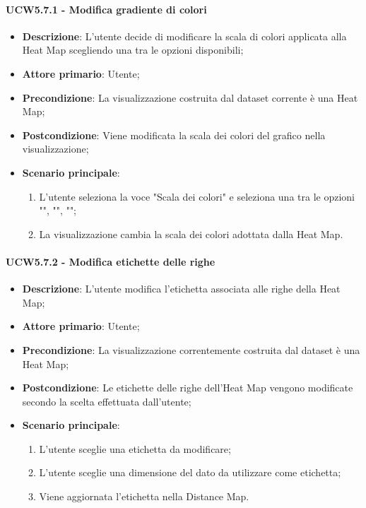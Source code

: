 \paragraph{UCW5.7.1 - Modifica gradiente di colori}
\label{par:ucw5.7.1}
\begin{itemize}
    \item \textbf{Descrizione}: L'utente decide di modificare la scala di colori applicata alla Heat Map scegliendo una tra le opzioni disponibili;

    \item \textbf{Attore primario}: Utente;

    \item \textbf{Precondizione}:   La visualizzazione costruita dal dataset corrente è una Heat Map;
    \item \textbf{Postcondizione}:  Viene modificata la scala dei colori del grafico nella visualizzazione;

    \item \textbf{Scenario principale}:
          \begin{enumerate}
              \item L'utente seleziona la voce "Scala dei colori" e seleziona una tra le opzioni  "", "", "";
              \item La visualizzazione cambia la scala dei colori adottata dalla Heat Map.
          \end{enumerate}
\end{itemize}

\paragraph{UCW5.7.2 - Modifica etichette delle righe}
\label{par:ucw5.7.2}
\begin{itemize}
    \item \textbf{Descrizione}:     L'utente modifica l'etichetta associata alle righe della Heat Map;
    \item \textbf{Attore primario}: Utente;
    \item \textbf{Precondizione}:   La visualizzazione correntemente costruita dal dataset è una Heat Map;
    \item \textbf{Postcondizione}:  Le etichette delle righe dell'Heat Map vengono modificate secondo la scelta effettuata dall'utente;
    \item \textbf{Scenario principale}:
          \begin{enumerate}
              \item L'utente sceglie una etichetta da modificare;
              \item L'utente sceglie una dimensione del dato da utilizzare come etichetta;
              \item Viene aggiornata l'etichetta nella Distance Map.
          \end{enumerate}
\end{itemize}

